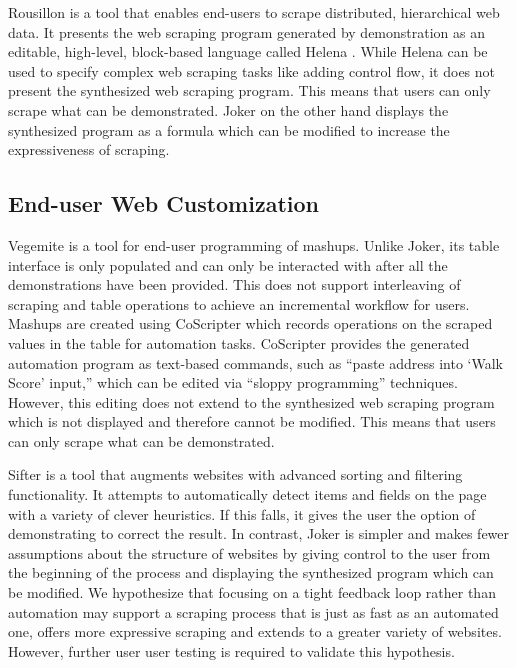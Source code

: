 \documentclass[sigconf,10pt]{acmart}
\begin{document}
Rousillon \citep{chasins2018} is a tool that enables end-users to scrape
distributed, hierarchical web data. It presents the web scraping program
generated by demonstration as an editable, high-level, block-based
language called Helena \citep{2021c}. While Helena can be used to
specify complex web scraping tasks like adding control flow, it does not
present the synthesized web scraping program. This means that users can
only scrape what can be demonstrated. Joker on the other hand displays
the synthesized program as a formula which can be modified to increase
the expressiveness of scraping.

\hypertarget{end-user-web-customization}{%
\subsection{End-user Web
Customization}\label{end-user-web-customization}}

Vegemite \citep{lin2009} is a tool for end-user programming of mashups.
Unlike Joker, its table interface is only populated and can only be
interacted with after all the demonstrations have been provided. This
does not support interleaving of scraping and table operations to
achieve an incremental workflow for users. Mashups are created using
CoScripter \citep{leshed2008} which records operations on the scraped
values in the table for automation tasks. CoScripter provides the
generated automation program as text-based commands, such as ``paste
address into `Walk Score' input,'' which can be edited via ``sloppy
programming'' \citep{lin2009} techniques. However, this editing does not
extend to the synthesized web scraping program which is not displayed
and therefore cannot be modified. This means that users can only scrape
what can be demonstrated.

Sifter \citep{huynh2006} is a tool that augments websites with advanced
sorting and filtering functionality. It attempts to automatically detect
items and fields on the page with a variety of clever heuristics. If
this falls, it gives the user the option of demonstrating to correct the
result. In contrast, Joker is simpler and makes fewer assumptions about
the structure of websites by giving control to the user from the
beginning of the process and displaying the synthesized program which
can be modified. We hypothesize that focusing on a tight feedback loop
rather than automation may support a scraping process that is just as
fast as an automated one, offers more expressive scraping and extends to
a greater variety of websites. However, further user user testing is
required to validate this hypothesis.
\end{document}
